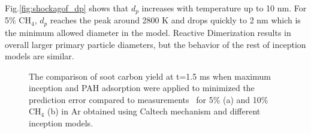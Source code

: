 Fig.\ref{fig:shockagof_dp} shows that $d_p$ increases with temperature up to 10 nm. For 5\% $\mathrm{CH_4}$, $d_p$ reaches the peak around 2800 K and drops quickly to 2 nm which is the minimum allowed diameter in the model. Reactive Dimerization results in overall larger primary particle diameters, but the behavior of the rest of inception models are similar.

\begin{figure}[H]
	\centering
	\caption{The comparison of soot carbon yield at t=1.5 ms when maximum inception and PAH adsorption were applied to minimized the prediction  error compared to measurements~\citep{agafonov2016unified} for 5\% (a) and 10\%~$\mathrm{CH_4}$ (b) in Ar obtained using Caltech mechanism and different inception models.}
	\label{fig:shockagof_yield_maxincads_cvr} 
\end{figure}

